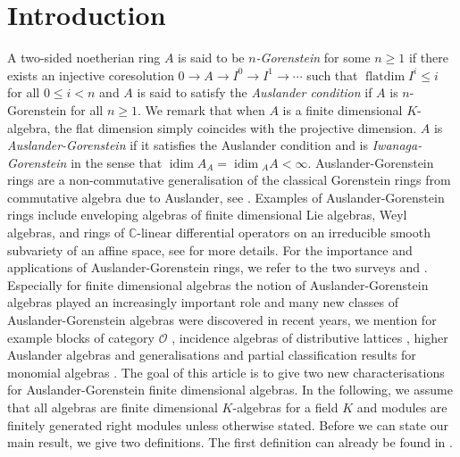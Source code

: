 \documentclass[a4paper]{amsart}
\theoremstyle{definition}
\theoremstyle{remark}
\numberwithin{equation}{section}
\newcommand{\idim}{\operatorname{idim}}
\newcommand{\flatdim}{\operatorname{\mathrm{flatdim}}}
\begin{document}
\section*{Introduction}
A two-sided noetherian ring $A$ is said to be \emph{$n$-Gorenstein} for some $n \geq 1$ if there exists an injective coresolution $0 \rightarrow A \rightarrow I^0 \rightarrow I^1 \rightarrow \cdots $ such that $\flatdim I^i \leq i$ for all $0 \leq i < n$ and $A$ is said to satisfy the \emph{Auslander condition} if $A$ is $n$-Gorenstein for all $n \geq 1$. We remark that when $A$ is a finite dimensional $K$-algebra, the flat dimension simply coincides with the projective dimension.
$A$ is \emph{Auslander-Gorenstein} if it satisfies the Auslander condition and is \emph{Iwanaga-Gorenstein} in the sense that $\idim A_A= \idim {}_{A}A < \infty$. 
Auslander-Gorenstein rings are a non-commutative generalisation of the classical Gorenstein rings from commutative algebra due to Auslander, see \cite{B,FGR}.
Examples of Auslander-Gorenstein rings include enveloping algebras of finite dimensional Lie algebras, Weyl algebras, and rings of $\mathbb{C}$-linear differential operators on an irreducible smooth subvariety of an affine
space, see \cite[Chapter 3]{VO} for more details.
For the importance and applications of Auslander-Gorenstein rings, we refer to the two surveys \cite{Cl} and \cite{KM}. Especially for finite dimensional algebras the notion of Auslander-Gorenstein algebras played an increasingly important role and many new classes of Auslander-Gorenstein algebras were discovered in recent years, we mention for example blocks of category $\mathcal{O}$ \cite{KMM}, incidence algebras of distributive lattices \cite{IM}, higher Auslander algebras and generalisations \cite{I1,CIM} and partial classification results for monomial algebras \cite{K}.
The goal of this article is to give two new characterisations for Auslander-Gorenstein finite dimensional algebras.
In the following, we assume that all algebras are finite dimensional $K$-algebras for a field $K$ and modules are finitely generated right modules unless otherwise stated. Before we can state our main result, we give two definitions. The first definition can already be found in \cite{K,KM,KMT}.
\end{document}
